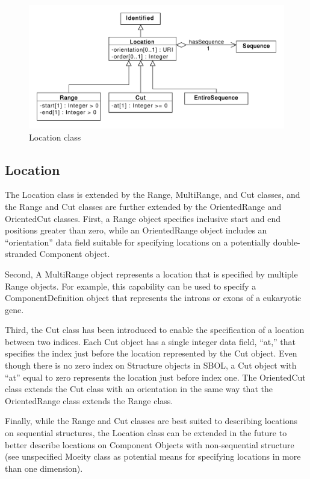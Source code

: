 \documentclass[draftspec]{sbmlpkgspec}
\begin{document}
\begin{figure}[h]
\begin{center}
\includegraphics[width=\textwidth]{uml/location}
\caption[]{Location class}
\label{uml:location}
\end{center}
\end{figure}

\subsection{Location}

The Location class is extended by the Range, MultiRange, and Cut classes, and the Range and Cut classes are further extended by the OrientedRange and OrientedCut classes. First, a Range object specifies inclusive start and end positions greater than zero, while an OrientedRange object includes an “orientation” data field suitable for specifying locations on a potentially double-stranded Component object.

Second, A MultiRange object represents a location that is specified by multiple Range objects. For example, this capability can be used to specify a ComponentDefinition object that represents the introns or exons of a eukaryotic gene.

Third, the Cut class has been introduced to enable the specification of a location between two indices. Each Cut object has a single integer data field, “at,” that specifies the index just before the location represented by the Cut object. Even though there is no zero index on Structure objects in SBOL, a Cut object with “at” equal to zero represents the location just before index one. The OrientedCut class extends the Cut class with an orientation in the same way that the OrientedRange class extends the Range class.

Finally, while the Range and Cut classes are best suited to describing locations on sequential structures, the Location class can be extended in the future to better describe locations on Component Objects with non-sequential structure (see unspecified Moeity class as potential means for specifying locations in more than one dimension).
\end{document}
